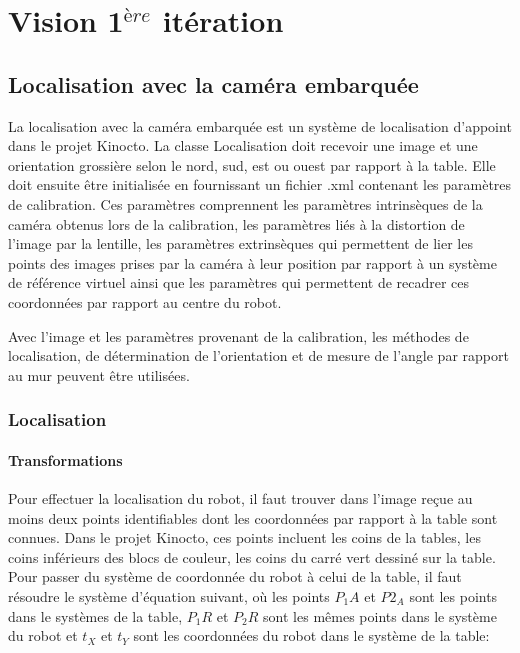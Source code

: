 


\chapter{Vision 1$^{ère}$ itération}
\label{vision1}

\section{Localisation avec la caméra embarquée}

La localisation avec la caméra embarquée est un système de localisation d'appoint dans le projet Kinocto. La classe Localisation doit recevoir une image et une orientation grossière selon le nord, sud, est ou ouest par rapport à la table. Elle doit ensuite être initialisée en fournissant un fichier .xml contenant les paramètres de calibration. Ces paramètres comprennent les paramètres intrinsèques de la caméra obtenus lors de la calibration, les paramètres liés à la distortion de l'image par la lentille, les paramètres extrinsèques qui permettent de lier les points des images prises par la caméra à leur position par rapport à un système de référence virtuel ainsi que les paramètres qui permettent de recadrer ces coordonnées par rapport au centre du robot.

Avec l'image et les paramètres provenant de la calibration, les méthodes de localisation, de détermination de l'orientation et de mesure de l'angle par rapport au mur peuvent être utilisées.

\subsection{Localisation}

\subsubsection{Transformations}

Pour effectuer la localisation du robot, il faut trouver dans l'image reçue au moins deux points identifiables dont les coordonnées par rapport à la table sont connues. Dans le projet Kinocto, ces points incluent les coins de la tables, les coins inférieurs des blocs de couleur, les coins du carré vert dessiné sur la table. Pour passer du système de coordonnée du robot à celui de la table, il faut résoudre le système d'équation suivant, où les points $P_1A$ et $P2_A$ sont les points dans le systèmes de la table, $P_1R$ et $P_2R$ sont les mêmes points dans le système du robot et $t_X$ et $t_Y$ sont les coordonnées du robot dans le système de la table:

